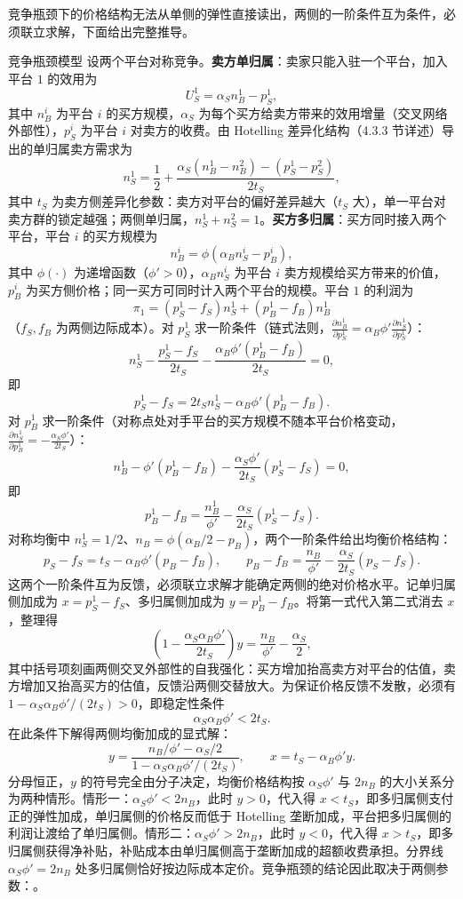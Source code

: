 竞争瓶颈下的价格结构无法从单侧的弹性直接读出，两侧的一阶条件互为条件，必须联立求解，下面给出完整推导。

\begin{derivation}{竞争瓶颈模型}{}
设两个平台对称竞争。\textbf{卖方单归属}：卖家只能入驻一个平台，加入平台 $1$ 的效用为
\[
U_S^1 = \alpha_S n_B^1 - p_S^1,
\]
其中 $n_B^i$ 为平台 $i$ 的买方规模，$\alpha_S$ 为每个买方给卖方带来的效用增量（交叉网络外部性），$p_S^i$ 为平台 $i$ 对卖方的收费。由 Hotelling 差异化结构（4.3.3 节详述）导出的单归属卖方需求为
\[
n_S^1 = \frac12 + \frac{\alpha_S(n_B^1-n_B^2) - (p_S^1-p_S^2)}{2t_S},
\]
其中 $t_S$ 为卖方侧差异化参数：卖方对平台的偏好差异越大（$t_S$ 大），单一平台对卖方群的锁定越强；两侧单归属，$n_S^1+n_S^2=1$。\textbf{买方多归属}：买方同时接入两个平台，平台 $i$ 的买方规模为
\[
n_B^i = \phi(\alpha_B n_S^i - p_B^i),
\]
其中 $\phi(\cdot)$ 为递增函数（$\phi' > 0$），$\alpha_B n_S^i$ 为平台 $i$ 卖方规模给买方带来的价值，$p_B^i$ 为买方侧价格；同一买方可同时计入两个平台的规模。平台 $1$ 的利润为
\[
\pi_1 = (p_S^1-f_S)n_S^1 + (p_B^1-f_B)n_B^1
\]
（$f_S, f_B$ 为两侧边际成本）。对 $p_S^1$ 求一阶条件（链式法则，$\frac{\partial n_B^1}{\partial p_S^1} = \alpha_B\phi'\frac{\partial n_S^1}{\partial p_S^1}$）：
\[
n_S^1 - \frac{p_S^1-f_S}{2t_S} - \frac{\alpha_B\phi'(p_B^1-f_B)}{2t_S} = 0,
\]
即
\[
p_S^1-f_S = 2t_S n_S^1 - \alpha_B\phi'(p_B^1-f_B).
\]
对 $p_B^1$ 求一阶条件（对称点处对手平台的买方规模不随本平台价格变动，$\frac{\partial n_S^1}{\partial p_B^1} = -\frac{\alpha_S\phi'}{2t_S}$）：
\[
n_B^1 - \phi'(p_B^1-f_B) - \frac{\alpha_S\phi'}{2t_S}(p_S^1-f_S) = 0,
\]
即
\[
p_B^1-f_B = \frac{n_B^1}{\phi'} - \frac{\alpha_S}{2t_S}(p_S^1-f_S).
\]
对称均衡中 $n_S^1 = 1/2$、$n_B = \phi(\alpha_B/2 - p_B)$，两个一阶条件给出均衡价格结构：
\[
p_S - f_S = t_S - \alpha_B\phi'(p_B-f_B), \qquad
p_B - f_B = \frac{n_B}{\phi'} - \frac{\alpha_S}{2t_S}(p_S-f_S).
\]
这两个一阶条件互为反馈，必须联立求解才能确定两侧的绝对价格水平。记单归属侧加成为 $x = p_S^1 - f_S$、多归属侧加成为 $y = p_B^1 - f_B$。将第一式代入第二式消去 $x$，整理得
\[
\left(1 - \frac{\alpha_S\alpha_B\phi'}{2t_S}\right) y = \frac{n_B}{\phi'} - \frac{\alpha_S}{2},
\]
其中括号项刻画两侧交叉外部性的自我强化：买方增加抬高卖方对平台的估值，卖方增加又抬高买方的估值，反馈沿两侧交替放大。为保证价格反馈不发散，必须有 $1 - \alpha_S\alpha_B\phi'/(2t_S) > 0$，即稳定性条件
\[
\alpha_S\alpha_B\phi' < 2t_S.
\]
在此条件下解得两侧均衡加成的显式解：
\[
y = \frac{n_B/\phi' - \alpha_S/2}{1 - \alpha_S\alpha_B\phi'/(2t_S)}, \qquad
x = t_S - \alpha_B\phi' y.
\]
分母恒正，$y$ 的符号完全由分子决定，均衡价格结构按 $\alpha_S\phi'$ 与 $2n_B$ 的大小关系分为两种情形。情形一：$\alpha_S\phi' < 2n_B$，此时 $y > 0$，代入得 $x < t_S$，即多归属侧支付正的弹性加成，单归属侧的价格反而低于 Hotelling 垄断加成，平台把多归属侧的利润让渡给了单归属侧。情形二：$\alpha_S\phi' > 2n_B$，此时 $y < 0$，代入得 $x > t_S$，即多归属侧获得净补贴，补贴成本由单归属侧高于垄断加成的超额收费承担。分界线 $\alpha_S\phi' = 2n_B$ 处多归属侧恰好按边际成本定价。竞争瓶颈的结论因此取决于两侧参数：。
\end{derivation}

